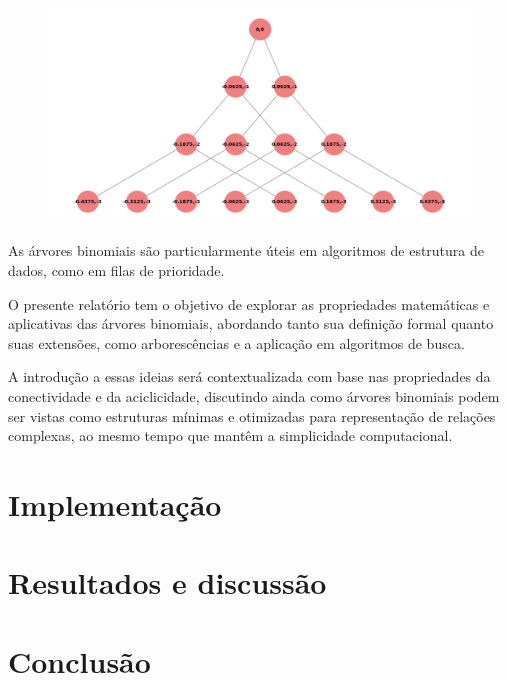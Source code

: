 \documentclass[12pt, a4paper]{scrreprt}
\begin{document}
\begin{figure}[h]
    \centering
    \includegraphics[width=.65\textwidth]{src/arvore_binomial_ordem_3.png}
    \label{fig:exemplo de árvore binomial}
\end{figure}

As árvores binomiais são particularmente úteis em algoritmos de estrutura de dados, como em filas de prioridade.

O presente relatório tem o objetivo de explorar as propriedades matemáticas e aplicativas das árvores binomiais, abordando tanto sua definição formal quanto suas extensões, como arborescências e a aplicação em algoritmos de busca.

A introdução a essas ideias será contextualizada com base nas propriedades da conectividade e da aciclicidade, discutindo ainda como árvores binomiais podem ser vistas como estruturas mínimas e otimizadas para representação de relações complexas, ao mesmo tempo que mantêm a simplicidade computacional.

\chapter{Implementação}

\chapter{Resultados e discussão}

\chapter{Conclusão}


\printbibliography %
\end{document}
